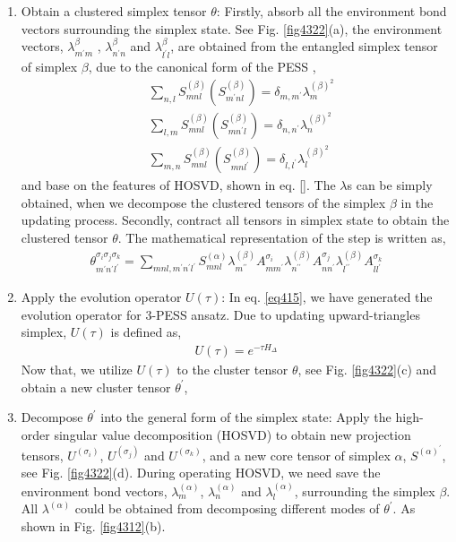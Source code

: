 \begin{enumerate}
	\item Obtain a clustered simplex tensor $\theta$: Firstly, absorb all the environment bond vectors surrounding the simplex state. See Fig. \ref{fig4322}(a),  the environment vectors, $\lambda^{\beta}_{m^{\prime}m}$ , $\lambda^{\beta}_{n^{\prime}n}$ and $\lambda^{\beta}_{l^{\prime}l}$, are obtained from the entangled simplex tensor of simplex $\beta$, due to the canonical form of the PESS \cite{},
		\begin{align}
			&\sum_{n,l}{S^{(\beta)}_{mnl}\left( S^{(\beta)}_{m^{\prime}nl}\right)} = \delta_{m,m^{\prime}} \lambda^{(\beta)^2}_{m} \\
			&\sum_{l,m}{S^{(\beta)}_{mnl}\left( S^{(\beta)}_{mn^{\prime}l}\right)} = \delta_{n,n^{\prime}} \lambda^{(\beta)^2}_{n} \\
			&\sum_{m,n}{S^{(\beta)}_{mnl}\left( S^{(\beta)}_{mnl^{\prime}}\right)} = \delta_{l,l^{\prime}} \lambda^{(\beta)^2}_{l}
		\end{align}
		and base on the features of HOSVD, shown in eq. \ref{}. The $\lambda$s can be simply obtained, when we decompose the clustered tensors of the simplex $\beta$ in the updating process. Secondly, contract all tensors in simplex state to obtain the clustered tensor $\theta$. The mathematical representation of the step is written as,  
		\begin{align}
			\theta_{m^{\prime} n^{\prime} l^{\prime}}^{\sigma_i \sigma_j \sigma_k} = \sum_{mnl,m^{\prime}n^{\prime}l^{\prime}}{S^{(\alpha)}_{mnl} \lambda^{(\beta)}_{m^{\prime \prime}} A^{\sigma_i}_{mm^{\prime}} \lambda^{(\beta)}_{n^{\prime \prime}} A^{\sigma_j}_{nn^{\prime}} \lambda^{(\beta)}_{l^{\prime \prime}} A^{\sigma_k}_{ll^{\prime}}}
		\end{align}
	\item Apply the evolution operator $U(\tau)$: In eq. \ref{eq415}, we have generated the evolution operator for 3-PESS ansatz. Due to updating upward-triangles simplex, $U(\tau)$ is defined as, 
		\begin{align}
			U(\tau) = e^{-\tau H_{\Delta}}
		\end{align}
		Now that, we utilize $U(\tau)$ to the cluster tensor $\theta$, see Fig. \ref{fig4322}(c) and obtain a new cluster tensor $\theta^{\prime}$, 
	\item Decompose $\theta^{\prime}$ into the general form of the simplex state: Apply the high-order singular value decomposition (HOSVD) to obtain new projection tensors, $U^{(\sigma_i)}$, $U^{(\sigma_j)}$ and $U^{(\sigma_k)}$, and a new core tensor of simplex $\alpha$, $S^{(\alpha)^{\prime}}$, see Fig. \ref{fig4322}(d). During operating HOSVD, we need save the environment bond vectors, $\lambda^{(\alpha)}_{m}$, $\lambda^{(\alpha)}_{n}$ and $\lambda^{(\alpha)}_{l}$, surrounding the simplex $\beta$. All $\lambda^{(\alpha)}$ could be obtained from decomposing different modes of $\theta^{\prime}$. As shown in Fig. \ref{fig4312}(b).

\end{enumerate}
